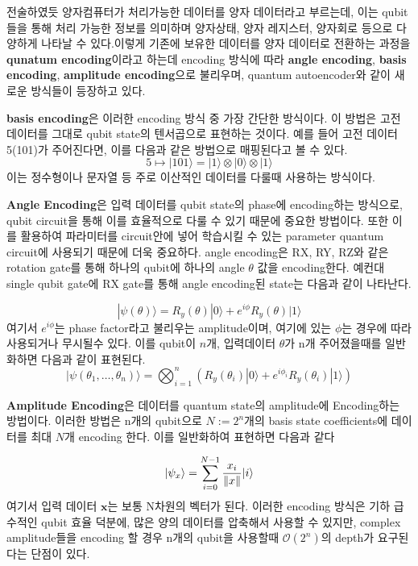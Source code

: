 전술하였듯 양자컴퓨터가 처리가능한 데이터를 양자 데이터라고 부르는데, 이는 qubit들을 통해 처리 가능한 정보를 의미하며 양자상태, 양자 레지스터, 양자회로 등으로 다양하게 나타날 수 있다.이렇게 기존에 보유한 데이터를 양자 데이터로 전환하는 과정을 \textbf{qunatum encoding}이라고 하는데 encoding 방식에 따라 \textbf{angle encoding}, \textbf{basis encoding}, \textbf{amplitude encoding}으로 불리우며, quantum autoencoder와 같이 새로운 방식들이 등장하고 있다.\cite{rath2023quantum}

\textbf{basis encoding}은 이러한 encoding 방식 중 가장 간단한 방식이다. 이 방법은 고전 데이터를 그대로 qubit state의 텐서곱으로 표현하는 것이다. 예를 들어 고전 데이터 5(101)가 주어진다면, 이를 다음과 같은 방법으로 매핑된다고 볼 수 있다.
\[
5 \mapsto |101\rangle = |1\rangle \otimes |0\rangle \otimes |1\rangle
\]
이는 정수형이나 문자열 등 주로 이산적인 데이터를 다룰때 사용하는 방식이다.

\textbf{Angle Encoding}은 입력 데이터를 qubit state의 phase에 encoding하는 방식으로, qubit circuit을 통해 이를 효율적으로 다룰 수 있기 때문에 중요한 방법이다. 또한 이를 활용하여 파라미터를 circuit안에 넣어 학습시킬 수 있는 parameter quantum circuit에 사용되기 때문에 더욱 중요하다. angle encoding은 RX, RY, RZ와 같은 rotation gate를 통해 하나의 qubit에 하나의 angle $\theta$ 값을 encoding한다. 예컨대 single qubit gate에 RX gate를 통해 angle encoding된 state는 다음과 같이 나타난다. %

\[
|\psi(\theta)\rangle = R_y(\theta)|0\rangle + e^{i\phi}R_y(\theta)|1\rangle
\]
여기서 $e^{i\phi}$는 phase factor라고 불리우는 amplitude이며, 여기에 있는 $\phi$는 경우에 따라 사용되거나 무시될수 있다. 이를 qubit이 $n$개, 입력데이터 $\theta$가 n개 주어졌을때를 일반화하면 다음과 같이 표현된다.
\[
        |\psi(\theta_1, \ldots, \theta_n)\rangle = \bigotimes_{i=1}^n (R_y(\theta_i)|0\rangle + e^{i\phi_i}R_y(\theta_i)|1\rangle)
\]

\textbf{Amplitude Encoding}은 데이터를 quantum state의 amplitude에 Encoding하는 방법이다. 이러한 방법은 n개의 qubit으로 $N := 2^n$개의 basis state coefficients에 데이터를 최대 $N$개 encoding 한다. 이를 일반화하여 표현하면 다음과 같다\cite{maronese2022quantum}

\[
|\psi_x\rangle = \sum_{i=0}^{N-1} \frac{x_{i}}{\norm{x}} |i\rangle
\]
여기서 입력 데이터 $\mathbf{x}$는 보통 N차원의 벡터가 된다. 이러한 encoding 방식은 기하 급수적인 qubit 효율 덕분에, 많은 양의 데이터를 압축해서 사용할 수 있지만, complex amplitude들을 encoding 할 경우 n개의 qubit을 사용할때 $\mathcal{O}(2^n)$의 depth가 요구된다는 단점이 있다.\cite{mitsuda2024approximate}

